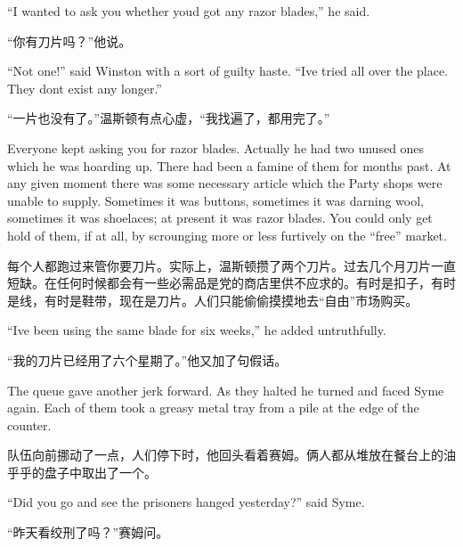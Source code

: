 \begin{paracol}{2}
\switchcolumn*

``I wanted to ask you whether you\textquotesingle d got any razor
blades,'' he said.

\switchcolumn

``你有刀片吗？''他说。

\switchcolumn*

``Not one!'' said Winston with a sort of guilty haste.
``I\textquotesingle ve tried all over the place. They
don\textquotesingle t exist any longer.''

\switchcolumn

``一片也没有了。''温斯顿有点心虚，``我找遍了，都用完了。''

\switchcolumn*

Everyone kept asking you for razor blades. Actually he had two unused
ones which he was hoarding up. There had been a famine of them for
months past. At any given moment there was some necessary article which
the Party shops were unable to supply. Sometimes it was buttons,
sometimes it was darning wool, sometimes it was shoelaces; at present it
was razor blades. You could only get hold of them, if at all, by
scrounging more or less furtively on the ``free'' market.

\switchcolumn

每个人都跑过来管你要刀片。实际上，温斯顿攒了两个刀片。过去几个月刀片一直短缺。在任何时候都会有一些必需品是党的商店里供不应求的。有时是扣子，有时是线，有时是鞋带，现在是刀片。人们只能偷偷摸摸地去``自由''市场购买。

\switchcolumn*

``I\textquotesingle ve been using the same blade for six weeks,'' he added
untruthfully.

\switchcolumn

``我的刀片已经用了六个星期了。''他又加了句假话。

\switchcolumn*

The queue gave another jerk forward. As they halted he turned and faced
Syme again. Each of them took a greasy metal tray from a pile at the
edge of the counter.

\switchcolumn

队伍向前挪动了一点，人们停下时，他回头看着赛姆。俩人都从堆放在餐台上的油乎乎的盘子中取出了一个。

\switchcolumn*

``Did you go and see the prisoners hanged yesterday?'' said Syme.

\switchcolumn

``昨天看绞刑了吗？''赛姆问。


\end{paracol}
